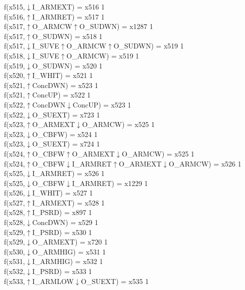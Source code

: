 f(x515,$\downarrow$I\_ARMEXT) = x516 {1} \\
f(x516,$\uparrow$I\_ARMRET) = x517 {1} \\
f(x517,$\uparrow$O\_ARMCW$\uparrow$O\_SUDWN) = x1287 {1} \\
f(x517,$\uparrow$O\_SUDWN) = x518 {1} \\
f(x517,$\downarrow$I\_SUVE$\uparrow$O\_ARMCW$\uparrow$O\_SUDWN) = x519 {1} \\
f(x518,$\downarrow$I\_SUVE$\uparrow$O\_ARMCW) = x519 {1} \\
f(x519,$\downarrow$O\_SUDWN) = x520 {1} \\
f(x520,$\uparrow$I\_WHIT) = x521 {1} \\
f(x521,$\uparrow$ConcDWN) = x523 {1} \\
f(x521,$\uparrow$ConcUP) = x522 {1} \\
f(x522,$\uparrow$ConcDWN$\downarrow$ConcUP) = x523 {1} \\
f(x522,$\downarrow$O\_SUEXT) = x723 {1} \\
f(x523,$\uparrow$O\_ARMEXT$\downarrow$O\_ARMCW) = x525 {1} \\
f(x523,$\downarrow$O\_CBFW) = x524 {1} \\
f(x523,$\downarrow$O\_SUEXT) = x724 {1} \\
f(x524,$\uparrow$O\_CBFW$\uparrow$O\_ARMEXT$\downarrow$O\_ARMCW) = x525 {1} \\
f(x524,$\uparrow$O\_CBFW$\downarrow$I\_ARMRET$\uparrow$O\_ARMEXT$\downarrow$O\_ARMCW) = x526 {1} \\
f(x525,$\downarrow$I\_ARMRET) = x526 {1} \\
f(x525,$\downarrow$O\_CBFW$\downarrow$I\_ARMRET) = x1229 {1} \\
f(x526,$\downarrow$I\_WHIT) = x527 {1} \\
f(x527,$\uparrow$I\_ARMEXT) = x528 {1} \\
f(x528,$\uparrow$I\_PSRD) = x897 {1} \\
f(x528,$\downarrow$ConcDWN) = x529 {1} \\
f(x529,$\uparrow$I\_PSRD) = x530 {1} \\
f(x529,$\downarrow$O\_ARMEXT) = x720 {1} \\
f(x530,$\downarrow$O\_ARMHIG) = x531 {1} \\
f(x531,$\downarrow$I\_ARMHIG) = x532 {1} \\
f(x532,$\downarrow$I\_PSRD) = x533 {1} \\
f(x533,$\uparrow$I\_ARMLOW$\downarrow$O\_SUEXT) = x535 {1} \\
